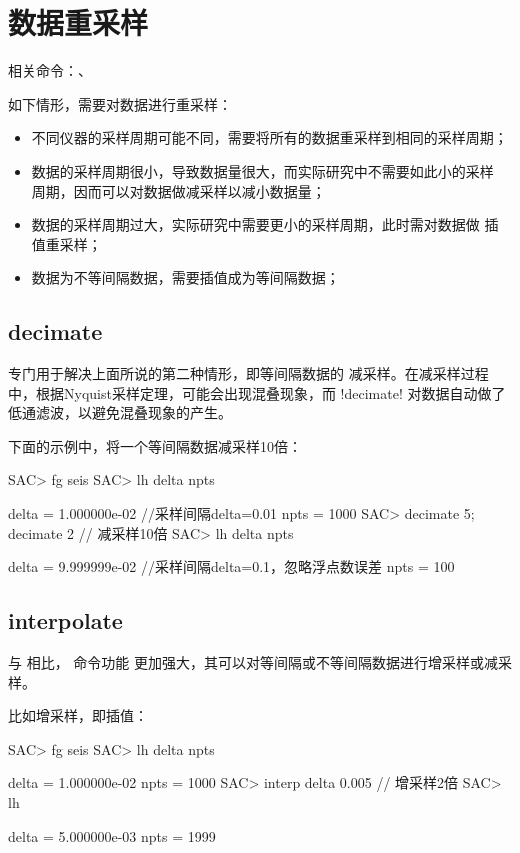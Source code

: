 \section{数据重采样}
相关命令：、

如下情形，需要对数据进行重采样：
\begin{itemize}
\item 不同仪器的采样周期可能不同，需要将所有的数据重采样到相同的采样周期；
\item 数据的采样周期很小，导致数据量很大，而实际研究中不需要如此小的采样
    周期，因而可以对数据做减采样以减小数据量；
\item 数据的采样周期过大，实际研究中需要更小的采样周期，此时需对数据做
    插值重采样；
\item 数据为不等间隔数据，需要插值成为等间隔数据；
\end{itemize}

\subsection{decimate}
 专门用于解决上面所说的第二种情形，即等间隔数据的
减采样。在减采样过程中，根据Nyquist采样定理，可能会出现混叠现象，而 
!decimate! 对数据自动做了低通滤波，以避免混叠现象的产生。

下面的示例中，将一个等间隔数据减采样10倍：
\begin{SACCode}
SAC> fg seis
SAC> lh delta npts

     delta = 1.000000e-02       //采样间隔delta=0.01
      npts = 1000
SAC> decimate 5; decimate 2     // 减采样10倍
SAC> lh delta npts

     delta = 9.999999e-02       //采样间隔delta=0.1，忽略浮点数误差
      npts = 100
\end{SACCode}

\subsection{interpolate}
与  相比， 命令功能
更加强大，其可以对等间隔或不等间隔数据进行增采样或减采样。

比如增采样，即插值：
\begin{SACCode}
SAC> fg seis
SAC> lh delta npts

     delta = 1.000000e-02
     npts = 1000
SAC> interp delta 0.005         // 增采样2倍
SAC> lh

     delta = 5.000000e-03
     npts = 1999
\end{SACCode}

